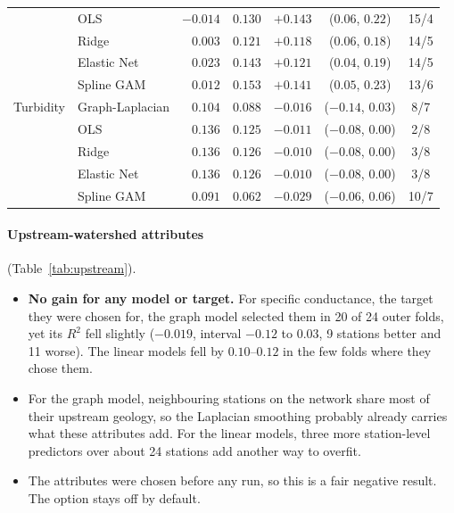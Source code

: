 \documentclass[11pt]{article}
\begin{document}
\begin{table}[h]
\begin{tabular}{ll rrrcc}
              & OLS             & $-0.014$ & $0.130$ & $\mathbf{+0.143}$ & ($0.06$, $0.22$) & 15/4 \\
              & Ridge           & $0.003$ & $0.121$ & $\mathbf{+0.118}$ & ($0.06$, $0.18$) & 14/5 \\
              & Elastic Net     & $0.023$ & $0.143$ & $\mathbf{+0.121}$ & ($0.04$, $0.19$) & 14/5 \\
              & Spline GAM      & $0.012$ & $0.153$ & $\mathbf{+0.141}$ & ($0.05$, $0.23$) & 13/6 \\
\addlinespace
Turbidity     & Graph-Laplacian & $0.104$ & $0.088$ & $-0.016$ & ($-0.14$, $0.03$) & 8/7 \\
              & OLS             & $0.136$ & $0.125$ & $-0.011$ & ($-0.08$, $0.00$) & 2/8 \\
              & Ridge           & $0.136$ & $0.126$ & $-0.010$ & ($-0.08$, $0.00$) & 3/8 \\
              & Elastic Net     & $0.136$ & $0.126$ & $-0.010$ & ($-0.08$, $0.00$) & 3/8 \\
              & Spline GAM      & $0.091$ & $0.062$ & $-0.029$ & ($-0.06$, $0.06$) & 10/7 \\
\bottomrule
\end{tabular}
\end{table}

\paragraph{Upstream-watershed attributes} (Table~\ref{tab:upstream}).
\begin{itemize}
  \item \textbf{No gain for any model or target.} For specific conductance, the target they were
        chosen for, the graph model selected them in 20 of 24 outer folds, yet its $R^2$ fell
        slightly ($-0.019$, interval $-0.12$ to $0.03$, 9 stations better and 11 worse). The linear
        models fell by $0.10$--$0.12$ in the few folds where they chose them.
  \item For the graph model, neighbouring stations on the network share most of their upstream
        geology, so the Laplacian smoothing probably already carries what these attributes add.
        For the linear models, three more station-level predictors over about 24 stations add
        another way to overfit.
  \item The attributes were chosen before any run, so this is a fair negative result. The option
        stays off by default.
\end{itemize}
\end{document}
